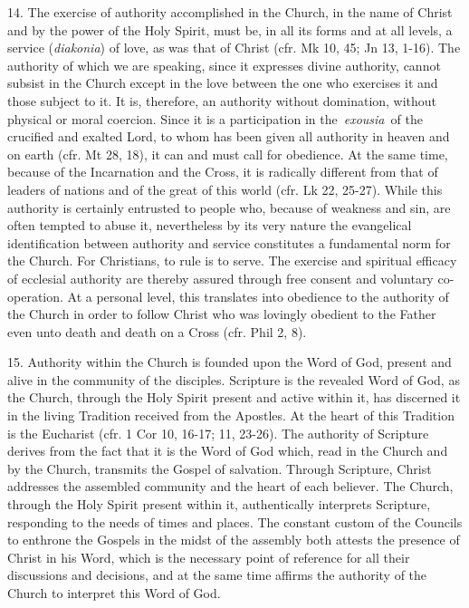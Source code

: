 14. The exercise of authority accomplished in the Church, in the name of
Christ and by the power of the Holy Spirit, must be, in all its forms
and at all levels, a service (\emph{diakonia}) of love, as was that of
Christ (cfr. Mk 10, 45; Jn 13, 1-16). The authority of which we are
speaking, since it expresses divine authority, cannot subsist in the
Church except in the love between the one who exercises it and those
subject to it. It is, therefore, an authority without domination,
without physical or moral coercion. Since it is a participation in
the~\emph{exousia}~of the crucified and exalted Lord, to whom has been
given all authority in heaven and on earth (cfr. Mt 28, 18), it can and
must call for obedience. At the same time, because of the Incarnation
and the Cross, it is radically different from that of leaders of nations
and of the great of this world (cfr. Lk 22, 25-27). While this authority
is certainly entrusted to people who, because of weakness and sin, are
often tempted to abuse it, nevertheless by its very nature the
evangelical identification between authority and service constitutes a
fundamental norm for the Church. For Christians, to rule is to serve.
The exercise and spiritual efficacy of ecclesial authority are thereby
assured through free consent and voluntary co-operation. At a personal
level, this translates into obedience to the authority of the Church in
order to follow Christ who was lovingly obedient to the Father even unto
death and death on a Cross (cfr. Phil 2, 8).

15. Authority within the Church is founded upon the Word of God, present
and alive in the community of the disciples. Scripture is the revealed
Word of God, as the Church, through the Holy Spirit present and active
within it, has discerned it in the living Tradition received from the
Apostles. At the heart of this Tradition is the Eucharist (cfr. 1 Cor
10, 16-17; 11, 23-26). The authority of Scripture derives from the fact
that it is the Word of God which, read in the Church and by the Church,
transmits the Gospel of salvation. Through Scripture, Christ addresses
the assembled community and the heart of each believer. The Church,
through the Holy Spirit present within it, authentically interprets
Scripture, responding to the needs of times and places. The constant
custom of the Councils to enthrone the Gospels in the midst of the
assembly both attests the presence of Christ in his Word, which is the
necessary point of reference for all their discussions and decisions,
and at the same time affirms the authority of the Church to interpret
this Word of God.

